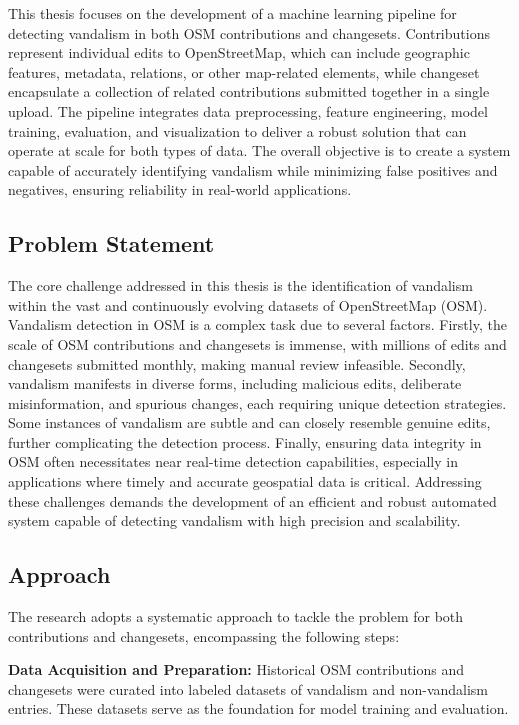 \documentclass[
    13pt, %
    a4paper, %
    DIV14, %
    listof=totoc, %
    bibliography=totoc, %
    index=totoc, %
    headsepline
]{scrreprt}
\begin{document}
This thesis focuses on the development of a machine learning pipeline for detecting vandalism in both OSM contributions and changesets. Contributions represent individual edits to OpenStreetMap, which can include geographic features, metadata, relations, or other map-related elements, while changeset encapsulate a collection of related contributions submitted together in a single upload. The pipeline integrates data preprocessing, feature engineering, model training, evaluation, and visualization to deliver a robust solution that can operate at scale for both types of data. The overall objective is to create a system capable of accurately identifying vandalism while minimizing false positives and negatives, ensuring reliability in real-world applications.

\subsection*{Problem Statement}

The core challenge addressed in this thesis is the identification of vandalism within the vast and continuously evolving datasets of OpenStreetMap (OSM). Vandalism detection in OSM is a complex task due to several factors. Firstly, the scale of OSM contributions and changesets is immense, with millions of edits and changesets submitted monthly, making manual review infeasible. Secondly, vandalism manifests in diverse forms, including malicious edits, deliberate misinformation, and spurious changes, each requiring unique detection strategies. Some instances of vandalism are subtle and can closely resemble genuine edits, further complicating the detection process. Finally, ensuring data integrity in OSM often necessitates near real-time detection capabilities, especially in applications where timely and accurate geospatial data is critical. Addressing these challenges demands the development of an efficient and robust automated system capable of detecting vandalism with high precision and scalability.

\subsection*{Approach}

The research adopts a systematic approach to tackle the problem for both contributions and changesets, encompassing the following steps:

\noindent\textbf{Data Acquisition and Preparation:} Historical OSM contributions and changesets were curated into labeled datasets of vandalism and non-vandalism entries. These datasets serve as the foundation for model training and evaluation.
\end{document}
